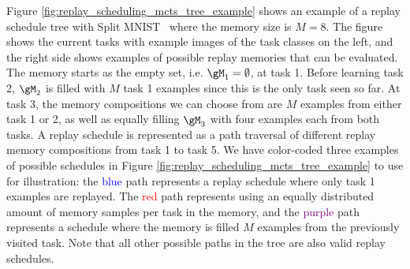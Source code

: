 Figure \ref{fig:replay_scheduling_mcts_tree_example} shows an example of a replay schedule tree with Split MNIST~\citep{zenke2017continual} 
where the memory size is $M=8$. %
The figure shows the current tasks with example images of the task classes on the left, and the right side shows examples of possible replay memories that can be evaluated. The memory starts as the empty set, i.e. $\gM_1 = \emptyset$, at task 1. Before learning task 2, $\gM_2$ is filled with $M$ task 1 examples since this is the only task seen so far. At task 3, the memory compositions we can choose from are $M$ examples from either task 1 or 2, as well as equally filling $\gM_3$ with four examples each from both tasks. 
A replay schedule is represented as a path traversal of different replay memory compositions from task 1 to task 5. We have color-coded three examples of possible schedules in Figure \ref{fig:replay_scheduling_mcts_tree_example} to use for illustration: the \textcolor{blue}{blue} path represents a replay schedule where only task 1 examples are replayed. %
The \textcolor{red}{red} path represents using an equally distributed amount of memory samples per task in the memory, and the \textcolor{purple}{purple} path represents a schedule where the memory is filled $M$ examples from the previously visited task. Note that all other possible paths in the tree are also valid replay schedules. 



